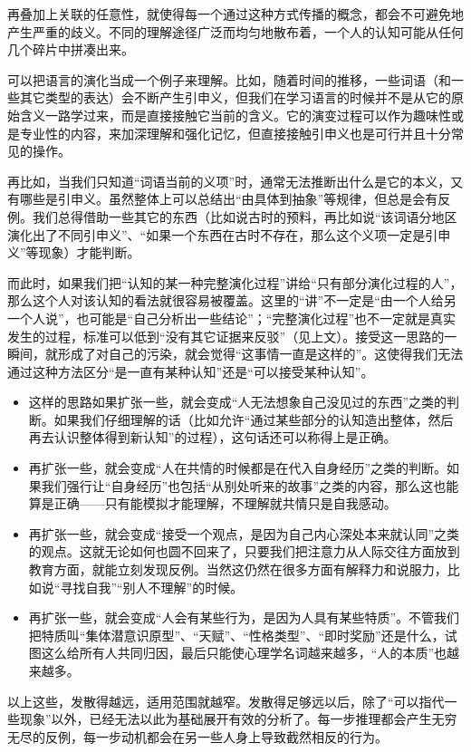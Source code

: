 再叠加上关联的任意性，就使得每一个通过这种方式传播的概念，都会不可避免地产生严重的歧义。不同的理解途径广泛而均匀地散布着，一个人的认知可能从任何几个碎片中拼凑出来。
\begin{explain}
\trained 可以把语言的演化当成一个例子来理解。比如，随着时间的推移，一些词语（和一些其它类型的表达）会不断产生引申义，但我们在学习语言的时候并不是从它的原始含义一路学过来，而是直接接触它当前的含义。它的演变过程可以作为趣味性或是专业性的内容，来加深理解和强化记忆，但直接接触引申义也是可行并且十分常见的操作。

再比如，当我们只知道“词语当前的义项”时，通常无法推断出什么是它的本义，又有哪些是引申义。虽然整体上可以总结出“由具体到抽象”等规律，但总是会有反例。我们总得借助一些其它的东西（比如说古时的预料，再比如说“该词语分地区演化出了不同引申义”、“如果一个东西在古时不存在，那么这个义项一定是引申义”等现象）才能判断。
\end{explain}
而此时，如果我们把“认知的某一种完整演化过程”讲给“只有部分演化过程的人”，那么这个人对该认知的看法就很容易被覆盖。这里的“讲”不一定是“由一个人给另一个人说”，也可能是“自己分析出一些结论”；“完整演化过程”也不一定就是真实发生的过程，标准可以低到“没有其它证据来反驳”（见上文）。接受这一思路的一瞬间，就形成了对自己的污染，就会觉得“这事情一直是这样的”。这使得我们无法通过这种方法区分“是一直有某种认知”还是“可以接受某种认知”。
\begin{explain}
    \begin{itemize}
        \item 这样的思路如果扩张一些，就会变成“人无法想象自己没见过的东西”之类的判断。如果我们仔细理解的话（比如允许“通过某些部分的认知造出整体，然后再去认识整体得到新认知”的过程），这句话还可以称得上是正确。
        \item 再扩张一些，就会变成“人在共情的时候都是在代入自身经历”之类的判断。如果我们强行让“自身经历”也包括“从别处听来的故事”之类的内容，那么这也能算是正确——只有能模拟才能理解，不理解就共情只是自我感动。
        \item 再扩张一些，就会变成“接受一个观点，是因为自己内心深处本来就认同”之类的观点。这就无论如何也圆不回来了，只要我们把注意力从人际交往方面放到教育方面，就能立刻发现反例。当然这仍然在很多方面有解释力和说服力，比如说“寻找自我”“别人不理解”的时候。
        \item 再扩张一些，就会变成“人会有某些行为，是因为人具有某些特质”。不管我们把特质叫“集体潜意识原型”、“天赋”、“性格类型”、“即时奖励”还是什么，试图这么给所有人共同归因，最后只能使心理学名词越来越多，“人的本质”也越来越多。
    \end{itemize}
    \noindent 以上这些，发散得越远，适用范围就越窄。发散得足够远以后，除了“可以指代一些现象”以外，已经无法以此为基础展开有效的分析了。每一步推理都会产生无穷无尽的反例，每一步动机都会在另一些人身上导致截然相反的行为。
\end{explain}

